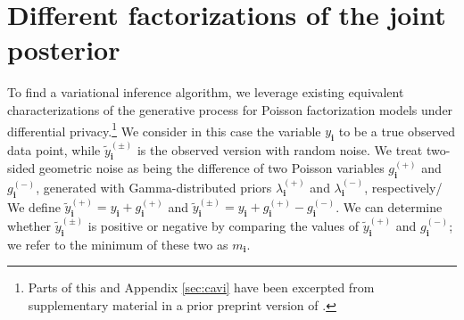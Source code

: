 \documentclass[letterpaper]{article}
\newcommand{\subs}{\pmb{i}}
\newcommand{\wsup}[2]{#1_{\subs}^{(#2)}}
\newcommand{\ytP}{\wsup{\tilde{y}}{+}}
\newcommand{\ytPM}{\wsup{\tilde{y}}{\pm}}
\newcommand{\ys}{y_{\subs}}
\newcommand{\lamP}{\wsup{\lambda}{+}}
\newcommand{\lamM}{\wsup{\lambda}{-}}
\newcommand{\gP}{\wsup{g}{+}}
\newcommand{\gM}{\wsup{g}{-}}
\newcommand{\ms}{m_{\subs}}
\begin{document}
  \section{Different factorizations of the joint posterior}
  
  \label{sec:generative}
  To find a variational inference algorithm, we leverage existing equivalent
  characterizations of the generative process for Poisson factorization models
  under differential privacy.\footnote{Parts of this and Appendix \ref{sec:cavi}
  have been excerpted from supplementary material in a prior preprint version of
  \citet{schein2018locally}.} We consider in this case the variable $\ys$ to be
  a true observed data point, while $\ytPM$ is the observed version with random
  noise. We treat two-sided geometric noise as being the difference of two
  Poisson variables $\gP$ and $\gM$, generated with Gamma-distributed priors
  $\lamP$ and $\lamM$, respectively/ We define $\ytP = \ys + \gP$ and $\ytPM =
  \ys + \gP - \gM$. We can determine whether $\ytPM$ is positive or negative by
  comparing the values of $\ytP$ and $\gM$; we refer to the minimum of these two
  as $\ms$.
  
\end{document}
